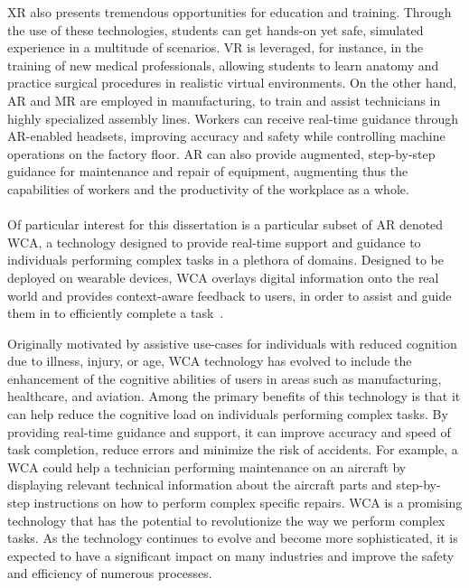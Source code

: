 \gls{XR} also presents tremendous opportunities for education and training.
Through the use of these technologies, students can get hands-on yet safe, simulated experience in a multitude of scenarios.
\gls{VR} is leveraged, for instance, in the training of new medical professionals, allowing students to learn anatomy and practice surgical procedures in realistic virtual environments.
On the other hand, \gls{AR} and \gls{MR} are employed in manufacturing, to train and assist technicians in highly specialized assembly lines.
Workers can receive real-time guidance through \gls{AR}-enabled headsets, improving accuracy and safety while controlling machine operations on the factory floor.
\gls{AR} can also provide augmented, step-by-step guidance for maintenance and repair of equipment, augmenting thus the capabilities of workers and the productivity of the workplace as a whole.

\paragraph{}\label{sec:background:wca}

Of particular interest for this dissertation is a particular subset of \gls{AR} denoted \acf{WCA}, a technology designed to provide real-time support and guidance to individuals performing complex tasks in a plethora of domains.
Designed to be deployed on wearable devices, \gls{WCA} overlays digital information onto the real world and provides context-aware feedback to users, in order to assist and guide them in to efficiently complete a task~\cite{ha2014towards,chen2015early,chen2018application,wang2020scaling}.

Originally motivated by assistive use-cases for individuals with reduced cognition due to illness, injury, or age, \gls{WCA} technology has evolved to include the enhancement of the cognitive abilities of users in areas such as manufacturing, healthcare, and aviation.
Among the primary benefits of this technology is that it can help reduce the cognitive load on individuals performing complex tasks.
By providing real-time guidance and support, it can improve accuracy and speed of task completion, reduce errors and minimize the risk of accidents.
For example, a \gls{WCA} could help a technician performing maintenance on an aircraft by displaying relevant technical information about the aircraft parts and step-by-step instructions on how to perform complex specific repairs.
\gls{WCA} is a promising technology that has the potential to revolutionize the way we perform complex tasks.
As the technology continues to evolve and become more sophisticated, it is expected to have a significant impact on many industries and improve the safety and efficiency of numerous processes.

